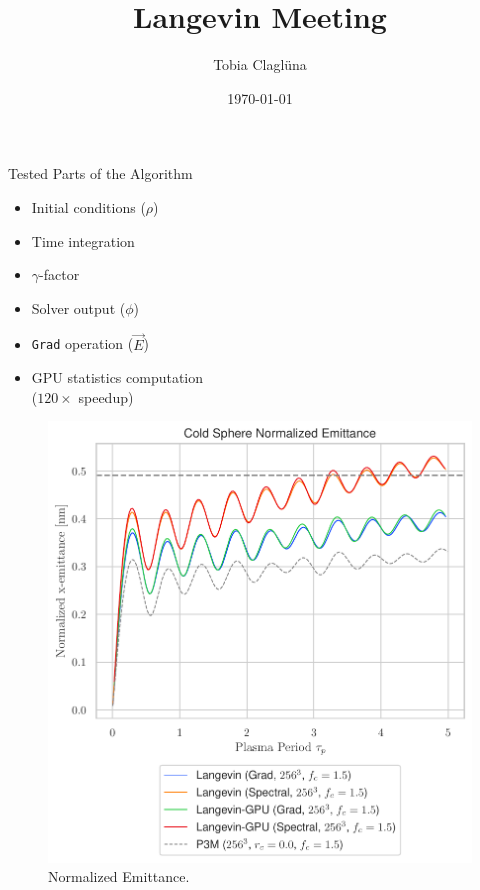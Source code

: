 
\title[\today]{Langevin Meeting}

\author{Tobia Claglüna}
\date{\today}
\def \myEmail {tobia.clagluena@psi.ch}




\begin{frame}[c]{Tested Parts of the Algorithm}
    \begin{multicols}{2}
    \begin{itemize}
        \item[\done]  Initial conditions ($\rho$)
        \item[\done]  Time integration
        \item[\done]  $\gamma$-factor
        \item[\done]  Solver output ($\phi$)
        \item[\done]  \texttt{Grad} operation ($\vec{E}$)
        \item[\done]  GPU statistics computation \\(\>$120 \times$ speedup)
    \end{itemize}
    \columnbreak
    \begin{figure}[!htb]
        \centering
        \captionsetup{justification=centering}
      \includegraphics[width=1.10\linewidth]{figures/grid256_Nemittance_gpu.pdf}
        \caption{Normalized Emittance.}
      \label{fig:awesome_image6}
    \end{figure}
    \end{multicols}
\end{frame}

